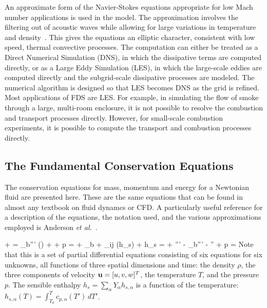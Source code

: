 \documentclass[11pt]{book}
\begin{document}
An approximate form of the Navier-Stokes equations appropriate for
low Mach number applications is used in the model.
The approximation involves the filtering out of acoustic waves while
allowing for large variations in temperature and density~\cite{Rehm:1}.
This gives the equations an elliptic character, consistent with low speed,
thermal convective processes. The computation can either be treated as a
Direct Numerical Simulation (DNS), in which the dissipative terms are computed directly,
or as a Large Eddy Simulation (LES), in which the large-scale eddies are computed
directly and the subgrid-scale dissipative processes are modeled. The numerical algorithm is
designed so that LES becomes DNS as the grid is refined.
Most applications of FDS are LES. For example, in simulating the flow of smoke through a large, multi-room enclosure, it
is not possible to resolve the combustion and transport processes directly.
However, for small-scale combustion experiments,
it is possible to compute the transport and combustion processes directly.

\subsection{The Fundamental Conservation Equations}

\label{basicequations}

The conservation equations for mass, momentum and energy for a
Newtonian fluid are presented here. These are the same equations that can
be found in almost any textbook on fluid dynamcs or CFD. A particularly useful
reference for a description of the equations, the notation used,
and the various approximations employed is Anderson {\em et al.}~\cite{Anderson:1}.

\vspace{\baselineskip}
\be {} + \nabla \cdot \rho \bu  =  \dm_b'''  \label{mass} \ee
{}
\be {} (\rho \bu) + \nabla \cdot \rho \bu \bu
+ \nabla p = \rho \bg + \bof_b
+ \nabla \cdot \btau_{ij}   \label{momentum} \ee
{}
\be {}(\rho h_s) + \nabla \cdot \rho h_s \bu =   + \dq''' - \dq_b'''
        - \nabla \cdot \dbq'' + \epsilon \label{energy} \ee
{}
\be p =   \label{basicstate} \ee
Note that this is a set of partial differential equations consisting of
six equations for six unknowns, all functions of three spatial dimensions and time:
the density $\rho$, the three components
of velocity ${\bf u}=[u,v,w]^T$, the temperature $T$, and the pressure $p$.
The sensible enthalpy $h_s = \sum_\alpha Y_\alpha h_{s,\alpha}$ is a function of the temperature: $h_{s,\alpha}(T)=\int_{T_0}^T c_{p,\alpha}(T') \, dT'$.
\end{document}
